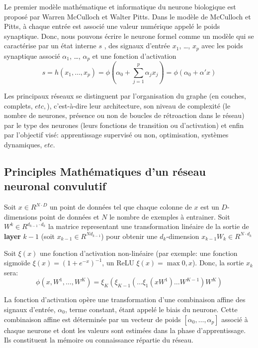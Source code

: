 \documentclass[
  11pt,
  dvipsnames]{article}
\begin{document}
Le premier modèle mathématique et informatique du neurone biologique est proposé par Warren McCulloch et Walter Pitts. Dans le modèle de McCulloch et Pitts, à chaque entrée est associé une valeur numérique appelé le poids synaptique.
Donc, nous pouvons écrire le neurone formel comme un modèle qui se caractérise par
un état interne \(s\) , des signaux d'entrée \(x_{1}\), \dots, \(x_{p}\) avec les poids synaptique associé
\(\alpha_{1}\), \dots, \(\alpha_{p}\) et une fonction d'activation
\[ s=h(x_{1},\dots,x_{p})=\phi(\alpha_{0} + \sum_{j=1}^{p} \alpha_{j}x_{j}) = \phi(\alpha_{0} + \alpha' x)\]

Les principaux réseaux se distinguent par l'organisation du graphe (en couches, complets, \(etc,\)), c'est-à-dire leur architecture, son niveau de complexité (le nombre de neurones, présence ou non de boucles de rétroaction dans le réseau) par le type des neurones (leurs fonctions de transition ou d'activation) et enfin par l'objectif visé: apprentissage supervisé ou non, optimisation, systèmes dynamiques, \(etc.\)

\hypertarget{principles-mathuxe9matiques-dun-ruxe9seau-neuronal-convulutif}{%
\subsection{Principles Mathématiques d'un réseau neuronal convulutif}\label{principles-mathuxe9matiques-dun-ruxe9seau-neuronal-convulutif}}

Soit \(x \in R^{N \cdot D}\) un point de données tel que chaque colonne de \(x\) est un \(D\)-dimensions point de données et \(N\) le nombre de exemples à entrainer. Soit \(W^k \in R^{d_{k-1} \cdot d_k}\) la matrice representant une transformation linéaire de la sortie de \textbf{layer} \(k-1\) (soit \(x_{k-1} \in R ^{Nd_{k-1}}\)) pour obtenir une \(d_k\)-dimension \(x_{k-1}W_{k} \in R^{N \cdot d_{k}}\)

Soit \(\xi(x)\) une fonction d'activation non-linéaire (par exemple: une fonction sigmoïde \(\xi(x) = (1+e^{-x})^{-1}\), un ReLU \(\xi(x) = \max{0,x}\)). Donc, la sortie \(x_k\) sera:
\[\phi (x, W^1, \dots, W^K)=\xi_K(\xi_{K-1}(\dots \xi_1(xW^1)\dots W^{K-1})W^K)\]

La fonction d'activation opère une transformation d'une combinaison affine
des signaux d'entrée, \(\alpha_{0}\), terme constant, étant appelé le biais du neurone.
Cette combinaison affine est déterminée par un vecteur de poids \([\alpha_{0},\dots,\alpha_{p}]\) associé à chaque neurone et dont les valeurs sont estimées dans la phase d'apprentissage.
Ils constituent la mémoire ou connaissance répartie du réseau.
\end{document}
